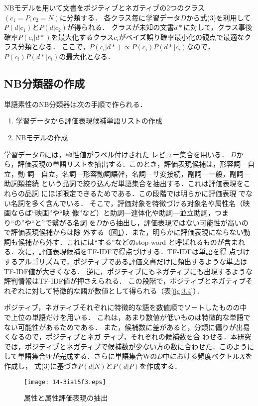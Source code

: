 \documentclass[japanese]{jnlp_1.3c}
\begin{document}
NBモデルを用いて文書をポジティブとネガティブの2つのクラス$(c_1=P,c_2=N)$に分類する．
各クラス毎に学習データ$D$から式(3)を利用して$P(d|c_1)とP(d|c_2)$が得られる．
クラスが未知の文書$d*$に対して，クラス事後確率$P(c_i|d*)$を最大化するクラス$c_i$がベイズ誤り確率最小化の観点で最適なクラス分類となる．
ここで，$P(c_i|d*)\propto P(c_i)P(d*|c_i)$なので，$P(c_i)P(d*|c_i)$の最大化となる．


\subsection{NB分類器の作成}
単語素性のNB分類器は次の手順で作られる．
\begin{enumerate}
\item 学習データから評価表現候補単語リストの作成
\item NBモデルの作成
\end{enumerate}
学習データ$D$には，極性値がラベル付けされた
レビュー集合を用いる．
$D$から，評価表現の単語リストを抽出する．このとき，評価表現候補は，形容詞—自立，動
詞—自立，名詞—形容動詞語幹，名詞—サ変接続，副詞—一般，副詞—助詞類接続
という品詞で絞り込んだ単語集合を抽出する．これは評価表現をこれらの品詞
にほぼ限定できるためである．この段階では明らかに評価表現
でない名詞を多く含んでいる．
そこで，評価対象を特徴づける対象名や属性名（映画ならば“映画”や“映
像”など）と助詞—連体化や助詞—並立助詞，つまり“の”や“と”で繋がる名詞
を$D$から抽出し，評価表現ではない可能性が高いので評価表現候補からは除
外する（図\ref{fig:3.3}）．また，明らかに評価表現にならない動詞も候補から外す．これには“する”などのstop-word
と呼ばれるものが含まれる．次に，評価表現候補をTF-IDFで得点づけする．TF-IDFは単語を得
点づけするアルゴリズムで，ポジティブである評価文書だけに頻出するような単語はTF-IDF値が大きくなる．
逆に，ポジティブにもネガティブにも出現するような評判情報はTF-IDF値が押さえられる．
この段階で，ポジティブとネガティブそれぞれに対して特徴的な語が数値として得られる（表\ref{fig:3.4}）．

ポジティブ，ネガティブそれぞれに特徴的な語を数値順でソートしたものの中
で上位の単語だけを用いる．
これは，あまり数値が低いものは特徴的な単語でない可能性があるためである．
また，候補数に差があると，分類に偏りが出易くなるので，ポジティブとネガ
ティブ，それぞれの候補数を合
わせる．本研究では，ポジティブとネガティブで候補数が少ない方の数に合わせた．このように
して単語集合$W$が完成する．さらに単語集合Wの$D$中における頻度ベクトル$X$を作成し，
式(3)に基づき$P(d|N)$と$P(d|P)$を作成する．

\begin{figure}[t]
 \begin{center}
       \texttt{[image: 14-3ia15f3.eps]}
  \caption{属性と属性評価表現の抽出}
  \label{fig:3.3}
 \end{center}
\end{figure}
\end{document}
